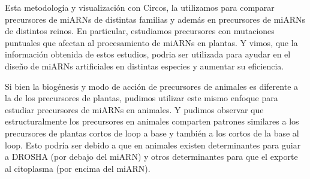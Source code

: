 Esta metodología y visualización con Circos, la utilizamos para comparar precursores de miARNs de distintas familias y además en precursores de miARNs de distintos reinos.
En particular, estudiamos precursores con mutaciones puntuales que afectan al procesamiento de miARNs en plantas.
Y vimos, que la información obtenida de estos estudios, podria ser utilizada para ayudar en el diseño de miARNs artificiales en distintas especies y aumentar su eficiencia.

Si bien la biogénesis y modo de acción de precursores de animales es diferente a la de los precursores de plantas, pudimos utilizar este mismo enfoque para estudiar precursores de miARNs en animales.
Y pudimos observar que estructuralmente los precursores en animales comparten patrones similares a los precursores de plantas cortos de loop a base y también a los cortos de la base al loop.
Esto podría ser debido a que en animales existen determinantes para guiar a DROSHA (por debajo del miARN) y otros determinantes para que el exporte al citoplasma (por encima del miARN).
